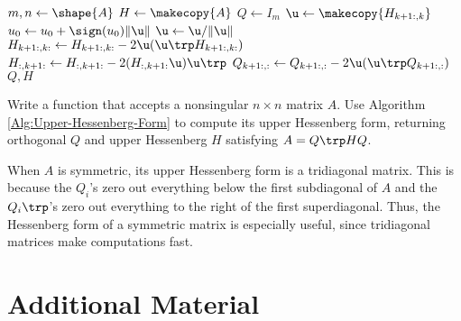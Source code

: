 \begin{comment}
The pseudocode for computing the Hessenberg form of a matrix with Householder transformations is shown in Algorithm \ref{Alg:Hessenberg}.
Although the Hessenberg form exists for any square matrix, this algorithm only works for full-rank square matrices.
Notice that this algorithm is very similar to Algorithm \ref{Alg:QR-via-Householder}.
\end{comment}

\begin{algorithm}[H]
\begin{algorithmic}[1]
    \State $m, n \gets \shape{A}$
    \State $H \gets \makecopy{A}$
    \State $Q \gets I_{m}$
        \State $\u \gets \makecopy{H_{k+1:,k}}$
        \State $u_0 \gets u_0 + \sign(u_0)\|\u\|$
        \State $\u \gets \u/\|\u\|$
        \State $H_{k+1:,k:} \gets H_{k+1:,k:} - 2\u(\u\trp H_{k+1:,k:})$
        \State $H_{:,k+1:} \gets H_{:,k+1:} - 2(H_{:,k+1:} \u) \u\trp$
        \State $Q_{k+1:,:} \gets Q_{k+1:,:} - 2\u(\u\trp Q_{k+1:,:})$
    \EndFor
    \State {} $Q, H$
\EndProcedure
\end{algorithmic}
\caption{}
\label{Alg:Upper-Hessenberg-Form}
\end{algorithm}

\begin{problem} %
Write a function that accepts a nonsingular $n \times n$ matrix $A$.
Use Algorithm \ref{Alg:Upper-Hessenberg-Form} to compute its upper Hessenberg form, returning orthogonal $Q$ and upper Hessenberg $H$ satisfying $A = Q\trp HQ$.
\end{problem}

\begin{info}
When $A$ is symmetric, its upper Hessenberg form is a tridiagonal matrix.
This is because the $Q_i$'s zero out everything below the first subdiagonal of $A$ and the $Q_i\trp$'s zero out everything to the right of the first superdiagonal.
Thus, the Hessenberg form of a symmetric matrix is especially useful, since tridiagonal matrices make computations fast.
\end{info}

\newpage

\section*{Additional Material} %

